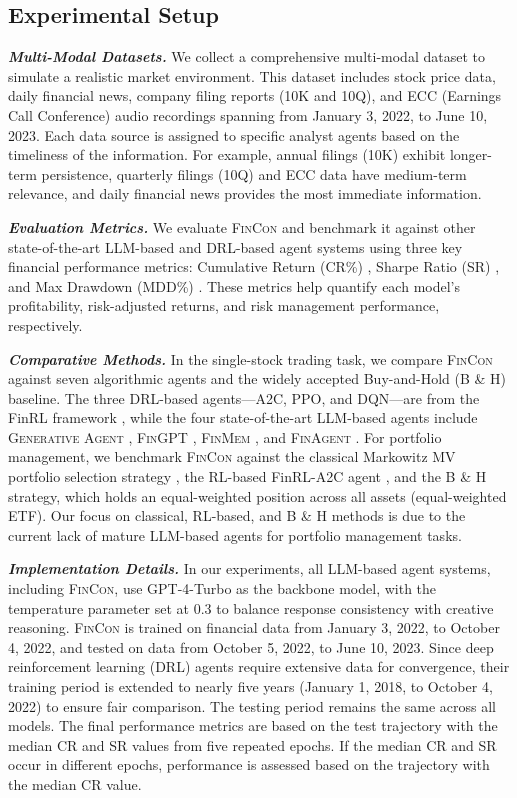 \subsection{Experimental Setup}
\label{Experimental Setup}
\textit{\textbf{Multi-Modal Datasets.}} We collect a comprehensive multi-modal dataset to simulate a realistic market environment. This dataset includes stock price data, daily financial news, company filing reports (10K and 10Q), and ECC (Earnings Call Conference) audio recordings spanning from January 3, 2022, to June 10, 2023. Each data source is assigned to specific analyst agents based on the timeliness of the information. For example, annual filings (10K) exhibit longer-term persistence, quarterly filings (10Q) and ECC data have medium-term relevance, and daily financial news provides the most immediate information.

\textit{\textbf{Evaluation Metrics.}} We evaluate \textsc{FinCon} and benchmark it against other state-of-the-art LLM-based and DRL-based agent systems using three key financial performance metrics: Cumulative Return (CR\%) \cite{hull2007risk}, Sharpe Ratio (SR) \cite{sharpe1994sharpe}, and Max Drawdown (MDD\%) \cite{ang2003downside}. These metrics help quantify each model's profitability, risk-adjusted returns, and risk management performance, respectively.

\textit{\textbf{Comparative Methods.}} In the single-stock trading task, we compare \textsc{FinCon} against seven algorithmic agents and the widely accepted Buy-and-Hold (B \& H) baseline. The three DRL-based agents—A2C, PPO, and DQN—are from the FinRL framework \cite{liu2020finrl}, while the four state-of-the-art LLM-based agents include \textsc{Generative Agent} \cite{park2023generative}, \textsc{FinGPT} \cite{liu2023fingpt}, \textsc{FinMem} \cite{yu2023finmem}, and \textsc{FinAgent} \cite{zhang2024finagent}. For portfolio management, we benchmark \textsc{FinCon} against the classical Markowitz MV portfolio selection strategy \cite{markowitz1952portfolio}, the RL-based FinRL-A2C agent \cite{liu2020finrl}, and the B \& H strategy, which holds an equal-weighted position across all assets (equal-weighted ETF). Our focus on classical, RL-based, and B \& H methods is due to the current lack of mature LLM-based agents for portfolio management tasks.

\textit{\textbf{Implementation Details.}} In our experiments, all LLM-based agent systems, including \textsc{FinCon}, use GPT-4-Turbo as the backbone model, with the temperature parameter set at 0.3 to balance response consistency with creative reasoning. \textsc{FinCon} is trained on financial data from January 3, 2022, to October 4, 2022, and tested on data from October 5, 2022, to June 10, 2023. Since deep reinforcement learning (DRL) agents require extensive data for convergence, their training period is extended to nearly five years (January 1, 2018, to October 4, 2022) to ensure fair comparison. The testing period remains the same across all models. The final performance metrics are based on the test trajectory with the median CR and SR values from five repeated epochs. If the median CR and SR occur in different epochs, performance is assessed based on the trajectory with the median CR value.
\newpage
